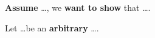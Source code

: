 

{\bf Assume} \ldots, we {\bf want to show} that \ldots.

\vspace{20pt}

Let \ldots be an {\bf arbitrary} \ldots. 